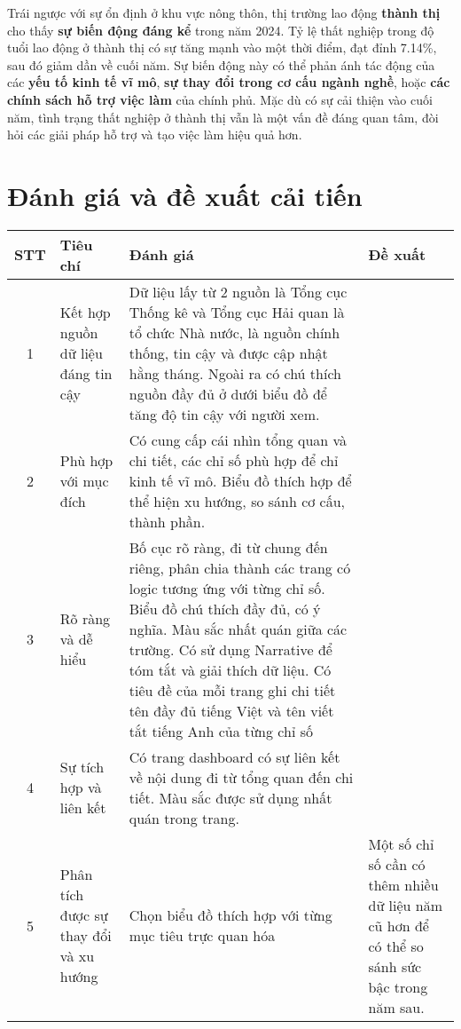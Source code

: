 \documentclass[a4paper]{report}
\begin{document}
{{Trái ngược với sự ổn định ở khu vực nông thôn, thị trường lao động \textbf{thành thị} cho thấy \textbf{sự biến động đáng kể} trong năm 2024. Tỷ lệ thất nghiệp trong độ tuổi lao động ở thành thị có sự tăng mạnh vào một thời điểm, đạt đỉnh 7.14\%, sau đó giảm dần về cuối năm. Sự biến động này có thể phản ánh tác động của các \textbf{yếu tố kinh tế vĩ mô}, \textbf{sự thay đổi trong cơ cấu ngành nghề}, hoặc \textbf{các chính sách hỗ trợ việc làm} của chính phủ. Mặc dù có sự cải thiện vào cuối năm, tình trạng thất nghiệp ở thành thị vẫn là một vấn đề đáng quan tâm, đòi hỏi các giải pháp hỗ trợ và tạo việc làm hiệu quả hơn.


\newpage
\section{Đánh giá và đề xuất cải tiến}
\begin{table}[h]
    \centering
    \begin{tabular}{|c| m{2.5cm} | m{6cm} | m{5.5cm} |}
        \hline
        \textbf{STT} & \textbf{Tiêu chí} & \textbf{Đánh giá} & \textbf{Đề xuất} \\
        \hline
        1 & Kết hợp nguồn dữ liệu đáng tin cậy & Dữ liệu lấy từ 2 nguồn là Tổng cục Thống kê và Tổng cục Hải quan là tổ chức Nhà nước, là nguồn chính thống, tin cậy và được cập nhật hằng tháng. Ngoài ra có chú thích nguồn đầy đủ ở dưới biểu đồ để tăng độ tin cậy với người xem. &   \\
        \hline
        2 & Phù hợp với mục đích & Có cung cấp cái nhìn tổng quan và chi tiết, các chỉ số phù hợp để chỉ kinh tế vĩ mô. Biểu đồ thích hợp để thể hiện xu hướng, so sánh cơ cấu, thành phần. &   \\
        \hline
        3 & Rõ ràng và dễ hiểu & Bố cục rõ ràng, đi từ chung đến riêng, phân chia thành các trang có logic tương ứng với từng chỉ số. Biểu đồ chú thích đầy đủ, có ý nghĩa. Màu sắc nhất quán giữa các trường. Có sử dụng Narrative để tóm tắt và giải thích dữ liệu. Có tiêu đề của mỗi trang ghi chi tiết tên đầy đủ tiếng Việt và tên viết tắt tiếng Anh của từng chỉ số &  \\
        \hline
        4 & Sự tích hợp và liên kết & Có trang dashboard có sự liên kết về nội dung đi từ tổng quan đến chi tiết. Màu sắc được sử dụng nhất quán trong trang. &   \\
        \hline
        5 & Phân tích được sự thay đổi và xu hướng & Chọn biểu đồ thích hợp với từng mục tiêu trực quan hóa & Một số chỉ số cần có thêm nhiều dữ liệu năm cũ hơn để có thể so sánh sức bậc trong năm sau. \\

\end{tabular}
\end{table}}}
\end{document}
